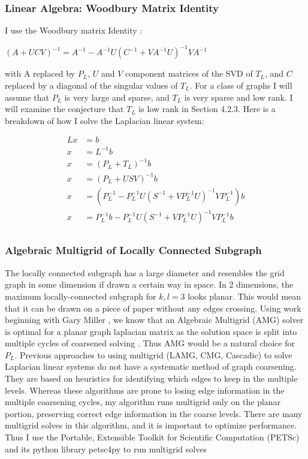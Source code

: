 \documentclass{article}
\begin{document}
\subsubsection{Linear Algebra: Woodbury Matrix Identity}
I use the Woodbury matrix Identity \cite{Woodbury:1950}:\\
\begin{spacing}{1}

\begin{center}
$(A+UCV)^{-1} = A^{-1} - A^{-1}U(C^{-1}+VA^{-1}U)^{-1}VA^{-1}$\\
\end{center}
\end{spacing}
with A replaced by $P_L$, $U$ and $V$ component matrices of the SVD of $T_L$, and $C$ replaced by a diagonal of the singular values of $T_L$. For a class of graphs I will assume that $P_L$ is very large and sparse, and $T_L$ is very sparse and low rank. I will examine the conjecture that $T_L$ is
low rank in Section 4.2.3. Here is a breakdown of how I solve the Laplacian linear system:

\begin{spacing}{1}
\begin{align*}
Lx & = b\\
x & = L^{-1}b\\
x & = (P_L+T_L)^{-1}b\\
x & = (P_L+USV)^{-1}b\\
x & = (P_L^{-1}-P_L^{-1}U(S^{-1}+VP_L^{-1}U)^{-1}VP_L^{-1})b\\
x & = P_L^{-1}b-P_L^{-1}U(S^{-1}+VP_L^{-1}U)^{-1}VP_L^{-1}b\\
\end{align*}
\end{spacing}


\subsubsection{Algebraic Multigrid of Locally Connected Subgraph}
The locally connected subgraph has a large diameter and resembles the grid graph in some dimension if drawn a certain way in space. In 2 dimensions, the maximum locally-connected subgraph for $k,l=3$ looks planar. This would mean that it can be drawn on a piece of paper without any edges crossing. Using work beginning with Gary Miller \cite{Miller:1995}, we know that an Algebraic Multigrid (AMG) solver is optimal for a planar graph laplacian matrix as the solution space is split into multiple cycles of coarsened solving \cite{Brandt:1984}. Thus AMG would be a natural choice for $P_L$. Previous approaches to using multigrid (LAMG, CMG, Cascadic) to solve Laplacian linear systems do not have a systematic method of graph coarsening. They are based on heuristics for identifying which edges to keep in the multiple levels. Whereas these algorithms are prone to losing edge information in the multiple coarsening cycles, my algorithm runs multigrid only on the planar portion, preserving correct edge information in the coarse levels. There are many multigrid solves in this algorithm, and it is important to optimize performance. Thus I use the Portable, Extensible Toolkit for Scientific Computation (PETSc) and its python library petsc4py to run multigrid solves \cite{petsc-user-ref, Dalcin:2011}
\end{document}
